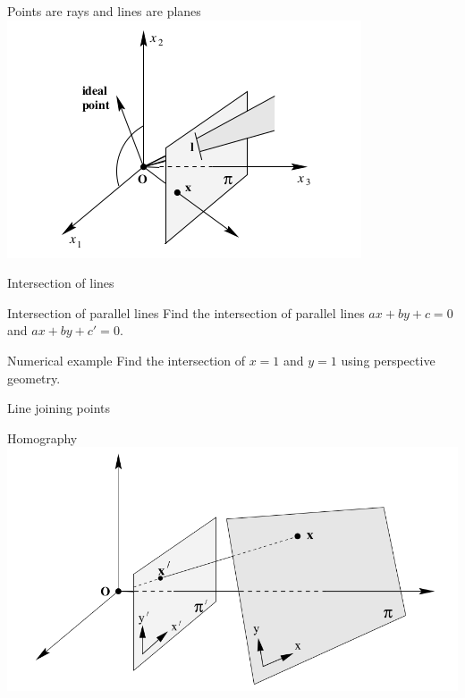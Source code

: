 \documentclass[times,t]{beamer}
\begin{document}
\begin{frame}{Points are rays and  lines are  planes}
  \includegraphics[width=\linewidth]{media/projective-plane-points-are-rays-and-lines-are-planes.png}
\end{frame}

\begin{frame}{Intersection of lines}
\end{frame}


\begin{frame}{Intersection  of  parallel  lines}
  Find   the  intersection  of  parallel lines  $ax+by+c =  0$  and  $ax+by+c'=0$.
\end{frame}

\begin{frame}{Numerical example}
  Find   the  intersection  of  $x =  1$  and  $y=1$ using  perspective  geometry.
\end{frame}

\begin{frame}{Line joining  points}
\end{frame}

\begin{frame}{Homography}
  \includegraphics[width=\linewidth]{media/homography-maps-a-line-to-a-line.png}
\end{frame}
\end{document}
